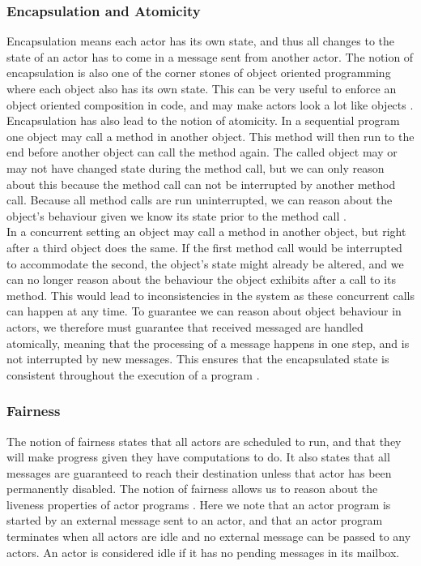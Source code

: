 \subsubsection{Encapsulation and Atomicity}
Encapsulation means each actor has its own state, and thus all changes to the state of an actor has to come in a message sent from another actor. The notion of encapsulation is also one of the corner stones of object oriented programming where each object also has its own state. This can be very useful to enforce an object oriented composition in code, and may make actors look a lot like objects \cite{ActorModelPaper}.\\
Encapsulation has also lead to the notion of atomicity. In a sequential program one object may call a method in another object. This method will then run to the end before another object can call the method again. The called object may or may not have changed state during the method call, but we can only reason about this because the method call can not be interrupted by another method call. Because all method calls are run uninterrupted, we can reason about the object's behaviour given we know its state prior to the method call \cite{ActorModelPaper}.\\
In a concurrent setting an object may call a method in another object, but right after a third object does the same. If the first method call would be interrupted to accommodate the second, the object's state might already be altered, and we can no longer reason about the behaviour the object exhibits after a call to its method. This would lead to inconsistencies in the system as these concurrent calls can happen at any time. To guarantee we can reason about object behaviour in actors, we therefore must guarantee that received messaged are handled atomically, meaning that the processing of a message happens in one step, and is not interrupted by new messages. This ensures that the encapsulated state is consistent throughout the execution of a program \cite{ActorModelPaper}.

\subsubsection{Fairness}
The notion of fairness states that all actors are scheduled to run, and that they will make progress given they have computations to do. It also states that all messages are guaranteed to reach their destination unless that actor has been permanently disabled. The notion of fairness allows us to reason about the liveness properties of actor programs \cite{ActorModelPaper}. Here we note that an actor program is started by an external message sent to an actor, and that an actor program terminates when all actors are idle and no external message can be passed to any actors. An actor is considered idle if it has no pending messages in its mailbox.

